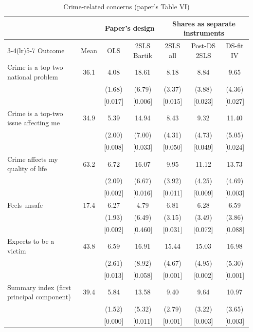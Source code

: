 \documentclass[11pt]{article}
\begin{document}
\begin{table}[htbp]
\centering
\small
\begin{threeparttable}
\caption{Crime-related concerns (paper's Table VI)}
\label{tab:concerns}
\begin{tabular}{lcccccc}
\toprule
 & & \multicolumn{2}{c}{Paper's design} & \multicolumn{3}{c}{Shares as separate instruments}\\
\cmidrule(lr){3-4}\cmidrule(lr){5-7}
Outcome & Mean & OLS & 2SLS Bartik & 2SLS all & Post-DS 2SLS & DS-fit IV \\
\midrule
Crime is a top-two national problem & 36.1 & 4.08 & 18.61 & 8.18 & 8.84 & 9.65 \\
 & & (1.68) & (6.79) & (3.37) & (3.88) & (4.36) \\
 & & [0.017] & [0.006] & [0.015] & [0.023] & [0.027] \\
\addlinespace
Crime is a top-two issue affecting me & 34.9 & 5.39 & 14.94 & 8.43 & 9.32 & 11.40 \\
 & & (2.00) & (7.00) & (4.31) & (4.73) & (5.05) \\
 & & [0.008] & [0.033] & [0.050] & [0.049] & [0.024] \\
\addlinespace
Crime affects my quality of life & 63.2 & 6.72 & 16.07 & 9.95 & 11.12 & 13.73 \\
 & & (2.09) & (6.67) & (3.92) & (4.25) & (4.69) \\
 & & [0.002] & [0.016] & [0.011] & [0.009] & [0.003] \\
\addlinespace
Feels unsafe & 17.4 & 6.27 & 4.79 & 6.81 & 6.28 & 6.59 \\
 & & (1.93) & (6.49) & (3.15) & (3.49) & (3.86) \\
 & & [0.002] & [0.460] & [0.031] & [0.072] & [0.088] \\
\addlinespace
Expects to be a victim & 43.8 & 6.59 & 16.91 & 15.44 & 15.03 & 16.98 \\
 & & (2.61) & (8.92) & (4.67) & (4.95) & (5.30) \\
 & & [0.013] & [0.058] & [0.001] & [0.002] & [0.001] \\
\addlinespace
Summary index (first principal component) & 39.4 & 5.84 & 13.58 & 9.40 & 9.64 & 10.97 \\
 & & (1.52) & (5.32) & (2.79) & (3.22) & (3.65) \\
 & & [0.000] & [0.011] & [0.001] & [0.003] & [0.003] \\
\bottomrule
\end{tabular}

\end{threeparttable}
\end{table}
\end{document}

